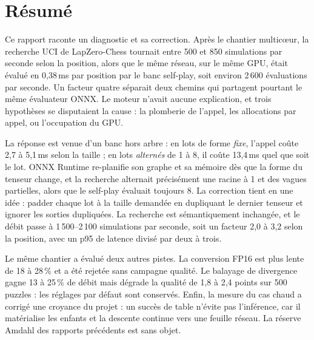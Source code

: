 \section*{R\'esum\'e}

Ce rapport raconte un diagnostic et sa correction. Apr\`es le chantier
multic\oe{}ur, la recherche UCI de LapZero-Chess tournait entre 500 et
850 simulations par seconde selon la position, alors que le m\^eme r\'eseau,
sur le m\^eme GPU, \'etait \'evalu\'e en 0,38\,ms par position par le banc
self-play, soit environ 2\,600 \'evaluations par seconde. Un facteur quatre
s\'eparait deux chemins qui partagent pourtant le m\^eme \'evaluateur ONNX.
Le moteur n'avait aucune explication, et trois hypoth\`eses se disputaient la
cause : la plomberie de l'appel, les allocations par appel, ou l'occupation du
GPU.

La r\'eponse est venue d'un banc hors arbre : en lots de forme \emph{fixe},
l'appel co\^ute 2,7 \`a 5,1\,ms selon la taille ; en lots \emph{altern\'es} de 1
\`a 8, il co\^ute 13,4\,ms quel que soit le lot. ONNX Runtime re-planifie son
graphe et sa m\'emoire d\`es que la forme du tenseur change, et la recherche
alternait pr\'ecis\'ement une racine \`a 1 et des vagues partielles, alors que
le self-play \'evaluait toujours 8. La correction tient en une id\'ee : padder
chaque lot \`a la taille demand\'ee en dupliquant le dernier tenseur et ignorer
les sorties dupliqu\'ees. La recherche est s\'emantiquement inchang\'ee, et le
d\'ebit passe \`a 1\,500--2\,100 simulations par seconde, soit un facteur 2,0
\`a 3,2 selon la position, avec un p95 de latence divis\'e par deux \`a trois.

Le m\^eme chantier a \'evalu\'e deux autres pistes. La conversion FP16 est plus
lente de 18 \`a 28\,\% et a \'et\'e rejet\'ee sans campagne qualit\'e. Le
balayage de divergence gagne 13 \`a 25\,\% de d\'ebit mais d\'egrade la
qualit\'e de 1,8 \`a 2,4 points sur 500 puzzles : les r\'eglages par d\'efaut
sont conserv\'es. Enfin, la mesure du cas chaud a corrig\'e une croyance du
projet : un succ\`es de table n'\'evite pas l'inf\'erence, car il mat\'erialise
les enfants et la descente continue vers une feuille r\'eseau. La r\'eserve
Amdahl des rapports pr\'ec\'edents est sans objet.

\vspace{0.6cm}

